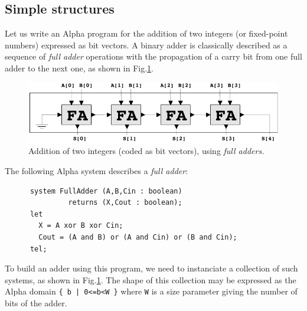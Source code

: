 \documentclass[12pt]{article}
\newcommand{\Alpha}{{\sc Alpha}}
\newcommand{\alfa}{\Alpha}
\begin{document}
\subsection{Simple structures} 
Let us write an {\alfa} program for the addition of two integers
(or fixed-point numbers) expressed as bit vectors.  A binary
adder is classically described as a sequence of \emph{full adder}
operations with the propagation of a carry bit from one full adder to
the next one, as shown in Fig.\ref{adder}.

\begin{figure}[!ht]
  \centerline{
    \includegraphics{adder.pdf}
  }
\caption{Addition of two integers (coded as bit vectors), using \emph{full adders.}\label{adder}}
\end{figure}

The following \alfa{} system describes a \emph{full adder}:
\begin{verbatim}
      system FullAdder (A,B,Cin : boolean) 
               returns (X,Cout : boolean);
      let
        X = A xor B xor Cin;
        Cout = (A and B) or (A and Cin) or (B and Cin);
      tel;
\end{verbatim}

To build an adder using this program, we need to 
instanciate a collection of such systems,
as shown in Fig.\ref{adder}. The shape of this collection may
be expressed as the {\alfa} domain \texttt{\{~b~|~0<=b<W~\}} where
\texttt{W} is a size parameter giving the number of bits of the
adder.
\end{document}
